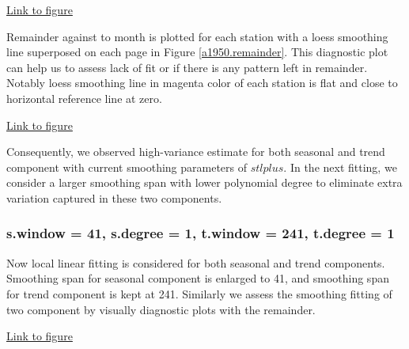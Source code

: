 \begin{framed}
\begin{center}
  \href{../plots/a1950/stlplus/t231td2_s21sd1_ffd/a1950.trend.vs.time.pdf}
  {Link to figure}
  \label{a1950.trend}
\end{center}
\end{framed}

Remainder against to month is plotted for each station with a loess smoothing 
line superposed on each page in Figure 
\href{../plots/a1950/stlplus/t231td2_s21sd1_ffd/a1950.remainder.vs.time.pdf}
{\ref*{a1950.remainder}}. This diagnostic plot can help us to assess lack of fit
or if there is any pattern left in remainder. Notably loess smoothing line in 
magenta color of each station is flat and close to horizontal reference line at 
zero.  

\begin{framed}
\begin{center}
  \href{../plots/a1950/stlplus/t231td2_s21sd1_ffd/a1950.remainder.vs.time.pdf}
  {Link to figure}
  \label{a1950.remainder}
\end{center}
\end{framed}

Consequently, we observed high-variance estimate for both seasonal and trend
component with current smoothing parameters of $stlplus$. In the next fitting, we
consider a larger smoothing span with lower polynomial degree to eliminate extra
variation captured in these two components. 

\subsubsection{s.window = 41, s.degree = 1, t.window = 241, t.degree = 1}

Now local linear fitting is considered for both seasonal and trend components. 
Smoothing span for seasonal component is enlarged to 41, and smoothing span for 
trend component is kept at 241. Similarly we assess the smoothing fitting of two
component by visually diagnostic plots with the remainder.

\begin{framed}
\begin{center}
  \href{../plots/a1950/stlplus/t241td1_s41sd1_ffd/a1950.stlraw.vs.time.pdf}
  {Link to figure}
  \label{a1950.fitted.vs.time2}
\end{center}
\end{framed}

